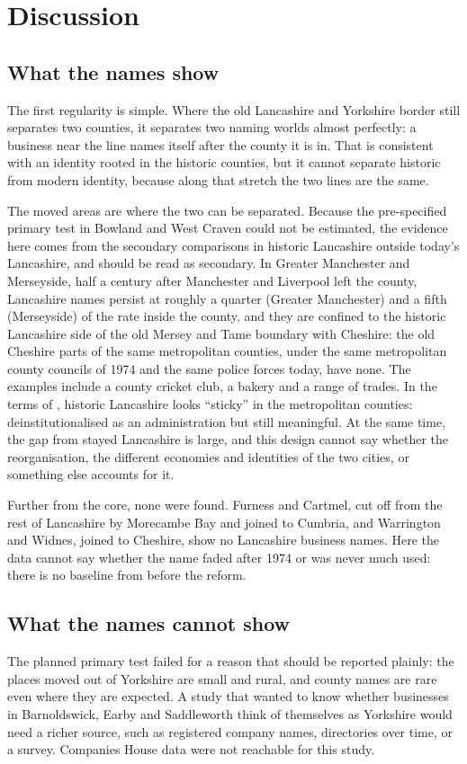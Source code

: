 \documentclass[11pt,a4paper]{article}
\begin{document}
\section{Discussion}\label{sec:disc}
\subsection{What the names show}
The first regularity is simple. Where the old Lancashire and Yorkshire border still separates two counties, it separates two naming worlds almost perfectly: a business near the line names itself after the county it is in. That is consistent with an identity rooted in the historic counties, but it cannot separate historic from modern identity, because along that stretch the two lines are the same.

The moved areas are where the two can be separated. Because the pre-specified primary test in Bowland and West Craven could not be estimated, the evidence here comes from the secondary comparisons in historic Lancashire outside today's Lancashire, and should be read as secondary. In Greater Manchester and Merseyside, half a century after Manchester and Liverpool left the county, Lancashire names persist at roughly a quarter (Greater Manchester) and a fifth (Merseyside) of the rate inside the county, and they are confined to the historic Lancashire side of the old Mersey and Tame boundary with Cheshire: the old Cheshire parts of the same metropolitan counties, under the same metropolitan county councils of 1974 and the same police forces today, have none. The examples include a county cricket club, a bakery and a range of trades. In the terms of \citet{zimmerbauer2017}, historic Lancashire looks ``sticky'' in the metropolitan counties: deinstitutionalised as an administration but still meaningful. At the same time, the gap from stayed Lancashire is large, and this design cannot say whether the reorganisation, the different economies and identities of the two cities, or something else accounts for it.

Further from the core, none were found. Furness and Cartmel, cut off from the rest of Lancashire by Morecambe Bay and joined to Cumbria, and Warrington and Widnes, joined to Cheshire, show no Lancashire business names. Here the data cannot say whether the name faded after 1974 or was never much used: there is no baseline from before the reform.

\subsection{What the names cannot show}
The planned primary test failed for a reason that should be reported plainly: the places moved out of Yorkshire are small and rural, and county names are rare even where they are expected. A study that wanted to know whether businesses in Barnoldswick, Earby and Saddleworth think of themselves as Yorkshire would need a richer source, such as registered company names, directories over time, or a survey. Companies House data were not reachable for this study.
\end{document}
